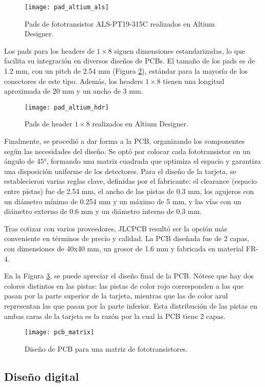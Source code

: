             \begin{figure}[hbtp]
                \centering
                \texttt{[image: pad\_altium\_als]}
                \caption{Pads de fototransistor ALS-PT19-315C realizados en Altium Designer.}
                \label{fig:pad_altium_als}
            \end{figure}

Los pads para los headers de $1\times 8$ siguen dimensiones estandarizadas, lo que facilita su integración en diversos diseños de PCBs. El tamaño de los pads es de 1.2 mm, con un pitch de 2.54 mm (Figura \ref {fig:pad_altium_hdr}), estándar para la mayoría de los conectores de este tipo. Además, los headers $1\times 8$ tienen una longitud aproximada de 20 mm y un ancho de 3 mm.

            \begin{figure}[hbtp]
                \centering
                \texttt{[image: pad\_altium\_hdr]}
                \caption{Pads de header $1 \times 8$ realizados en Altium Designer.}
                \label{fig:pad_altium_hdr}
            \end{figure}

Finalmente, se procedió a dar forma a la PCB, organizando los componentes según las necesidades del diseño. Se optó por colocar cada fototransistor en un ángulo de 45°, formando una matriz cuadrada que optimiza el espacio y garantiza una disposición uniforme de los detectores. Para el diseño de la tarjeta, se establecieron varias reglas clave, definidas por el fabricante: el clearance (espacio entre pistas) fue de 2.54 mm, el ancho de las pistas de 0.3 mm, los agujeros con un diámetro mínimo de 0.254 mm y un máximo de 5 mm, y las vías con un diámetro externo de 0.6 mm y un diámetro interno de 0.3 mm. 


Tras cotizar con varios proveedores, JLCPCB resultó ser la opción más conveniente en términos de precio y calidad. La PCB diseñada fue de 2 capas, con dimensiones de 40x40 mm, un grosor de 1.6 mm y fabricada en material FR-4.


En la Figura \ref{fig:pcb_matrix}, se puede apreciar el diseño final de la PCB. Nótese que hay dos colores distintos en las pistas: las pistas de color rojo corresponden a las que pasan por la parte superior de la tarjeta, mientras que las de color azul representan las que pasan por la parte inferior. Esta distribución de las pistas en ambas caras de la tarjeta es la razón por la cual la PCB tiene 2 capas.


            \begin{figure}[hbtp]
                \centering
                \texttt{[image: pcb\_matrix]}
                \caption{Diseño de PCB para una matriz de fototransistores.}
                \label{fig:pcb_matrix}
            \end{figure}

\subsection{Diseño digital}


